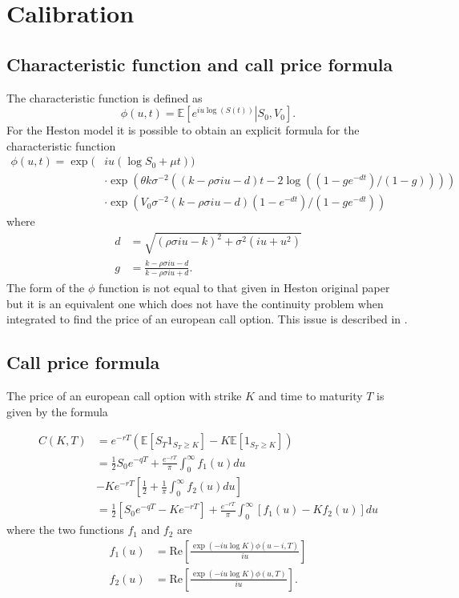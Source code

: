 \section{Calibration}


\subsection{Characteristic function and call price formula}

The characteristic function is defined as
\begin{equation}
\phi(u,t) = \mathbb{E} \left[\left.e^{iu\log(S(t))}\right|S_0,V_0\right].
\end{equation}
For the Heston model it is possible to obtain an explicit formula for the characteristic function
\begin{align}
\phi(u,t) = \exp( & iu(\log S_0 + \mu t)) \nonumber\\
 & \cdot\exp(\theta k \sigma^{-2}((k-\rho\sigma iu - d)t - 2\log( (1-ge^{-dt})/ (1-g) )))\nonumber\\
 & \cdot\exp(V_0\sigma^{-2}(k-\rho\sigma iu - d)(1-e^{-dt})/(1-ge^{-dt}))
\end{align}
where
\begin{align}
 d & = \sqrt{(\rho\sigma iu - k)^2 + \sigma^2(iu + u^2)} \\
 g & = \frac{k-\rho\sigma iu - d}{k-\rho\sigma iu + d}.
\end{align}
The form of the $\phi$ function is not equal to that given in Heston original paper but it is an equivalent one which does not have the continuity problem when integrated to find the price of an european call option. This issue is described in \cite{Albrecher:HestonTrap}.




\subsection{Call price formula}
\label{call}

The price of an european call option with strike $K$ and time to maturity $T$ is given by the formula

\begin{equation}
\begin{aligned}
C(K,T) &= e^{-r T}\left(	\mathbb{E}\left[S_T 1_{S_T \geq K} \right] - K \mathbb{E}\left[1_{S_T \geq K} \right]\right) \\
&=\frac{1}{2}S_0e^{-q T}+ \frac{e^{-r T}}{\pi}\int_0^{\infty}f_1(u) du  \\
&- K e^{-r T}  \left[ \frac{1}{2} + \frac{1}{\pi}\int_0^{\infty}f_2(u) du \right] \\
&=  \frac{1}{2}\left[S_0e^{-q T} - Ke^{-r T}\right] + \frac{e^{-r T}}{\pi}\int_0^{\infty}\left[f_1(u) - Kf_2(u)\right]du
\end{aligned}
\end{equation}
where the two functions $f_1$ and $f_2$ are
\begin{align}
f_1(u) & = \mathrm{Re}\left[\frac{\exp(-iu\log K)\phi(u-i,T)}{iu}\right]\\
f_2(u) & = \mathrm{Re}\left[\frac{\exp(-iu\log K)\phi(u,T)}{iu}\right].
\end{align}

